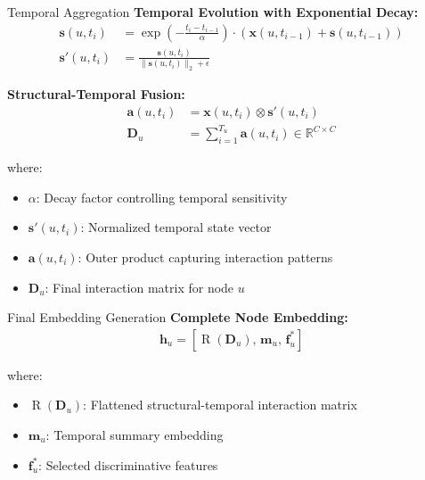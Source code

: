 \documentclass{beamer}
\begin{document}
\begin{frame}{Temporal Aggregation}
    \textbf{Temporal Evolution with Exponential Decay:}
    \begin{align}
    \mathbf{s}(u,t_i) &= \exp\!\left(-\frac{t_i - t_{i-1}}{\alpha}\right) \cdot (\mathbf{x}(u, t_{i-1}) + \mathbf{s}(u, t_{i-1})) \\
    \mathbf{s}'(u,t_i) &= \frac{\mathbf{s}(u,t_i)}{\|\mathbf{s}(u,t_i)\|_2 + \epsilon}
    \end{align}
    
    \textbf{Structural-Temporal Fusion:}
    \begin{align}
    \mathbf{a}(u, t_i) &= \mathbf{x}(u, t_i) \otimes \mathbf{s}'(u, t_i) \\
    \mathbf{D}_u &= \sum_{i=1}^{T_u} \mathbf{a}(u, t_i) \in \mathbb{R}^{C \times C}
    \end{align}
    
    where:
    \begin{itemize}
        \item $\alpha$: Decay factor controlling temporal sensitivity
        \item $\mathbf{s}'(u,t_i)$: Normalized temporal state vector
        \item $\mathbf{a}(u, t_i)$: Outer product capturing interaction patterns
        \item $\mathbf{D}_u$: Final interaction matrix for node $u$
    \end{itemize}
\end{frame}

\begin{frame}{Final Embedding Generation}
    \textbf{Complete Node Embedding:}
    \begin{align}
    \mathbf{h}_u = [\operatorname{R}(\mathbf{D}_u), \, \mathbf{m}_u, \, \mathbf{f}_u^{*}]
    \end{align}
    
    where:
    \begin{itemize}
        \item $\operatorname{R}(\mathbf{D}_u)$: Flattened structural-temporal interaction matrix
        \item $\mathbf{m}_u$: Temporal summary embedding  
        \item $\mathbf{f}_u^{*}$: Selected discriminative features
    \end{itemize}
    
    \vspace{0.5cm}
\end{frame}
\end{document}
